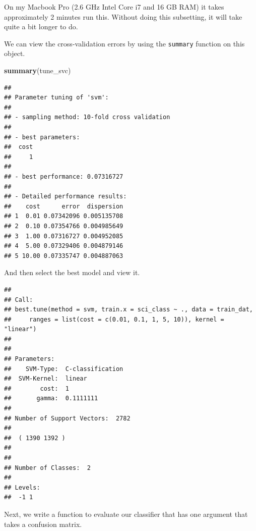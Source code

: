 \documentclass[]{book}
\newenvironment{Shaded}{\begin{snugshade}}{\end{snugshade}}
\newcommand{\KeywordTok}[1]{\textcolor[rgb]{0.13,0.29,0.53}{\textbf{#1}}}
\newcommand{\NormalTok}[1]{#1}
\newcommand{\OperatorTok}[1]{\textcolor[rgb]{0.81,0.36,0.00}{\textbf{#1}}}
\newcommand{\StringTok}[1]{\textcolor[rgb]{0.31,0.60,0.02}{#1}}
\begin{document}
On my Macbook Pro (2.6 GHz Intel Core i7 and 16 GB RAM) it takes approximately 2 minutes run this. Without doing this subsetting, it will take quite a bit longer to do.

We can view the cross-validation errors by using the \texttt{summary} function on this object.

\begin{Shaded}
\begin{Highlighting}[]
\KeywordTok{summary}\NormalTok{(tune_svc)}
\end{Highlighting}
\end{Shaded}

\begin{verbatim}
## 
## Parameter tuning of 'svm':
## 
## - sampling method: 10-fold cross validation 
## 
## - best parameters:
##  cost
##     1
## 
## - best performance: 0.07316727 
## 
## - Detailed performance results:
##    cost      error  dispersion
## 1  0.01 0.07342096 0.005135708
## 2  0.10 0.07354766 0.004985649
## 3  1.00 0.07316727 0.004952085
## 4  5.00 0.07329406 0.004879146
## 5 10.00 0.07335747 0.004887063
\end{verbatim}

And then select the best model and view it.

\begin{Shaded}
\end{Shaded}

\begin{verbatim}
## 
## Call:
## best.tune(method = svm, train.x = sci_class ~ ., data = train_dat, 
##     ranges = list(cost = c(0.01, 0.1, 1, 5, 10)), kernel = "linear")
## 
## 
## Parameters:
##    SVM-Type:  C-classification 
##  SVM-Kernel:  linear 
##        cost:  1 
##       gamma:  0.1111111 
## 
## Number of Support Vectors:  2782
## 
##  ( 1390 1392 )
## 
## 
## Number of Classes:  2 
## 
## Levels: 
##  -1 1
\end{verbatim}

Next, we write a function to evaluate our classifier that has one argument that takes a confusion matrix.
\end{document}
